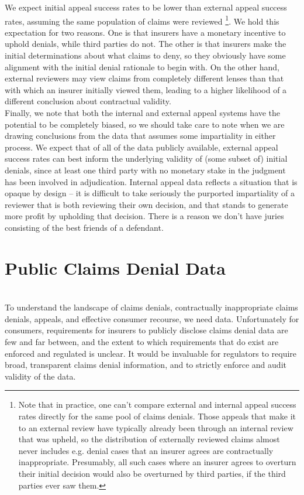 \documentclass[12pt, a4paper]{report}
\begin{document}
We expect initial appeal success rates to be lower than external appeal success rates, assuming the same population of claims were reviewed \footnote{Note that in practice, one can't compare external and internal appeal success rates directly for the same pool of claims denials. Those appeals that make it to an external review have typically already been through an internal review that was upheld, so the distribution of externally reviewed claims almost never includes e.g. denial cases that an insurer agrees are contractually inappropriate. Presumably, all such cases where an insurer agrees to overturn their initial decision would also be overturned by third parties, if the third parties ever saw them.}. We hold this expectation for two reasons. One is that insurers have a monetary incentive to uphold denials, while third parties do not. The other is that insurers make the initial determinations about what claims to deny, so they obviously have some alignment with the initial denial rationale to begin with. On the other hand, external reviewers may view claims from completely different lenses than that with which an insurer initially viewed them, leading to a higher likelihood of a different conclusion about contractual validity.\\

Finally, we note that both the internal and external appeal systems have the potential to be completely biased, so we should take care to note when we are drawing conclusions from the data that assumes some impartiality in either process. We expect that of all of the data publicly available, external appeal success rates can best inform the underlying validity of (some subset of) initial denials, since at least one third party with no monetary stake in the judgment has been involved in adjudication. Internal appeal data reflects a situation that is opaque by design -- it is difficult to take seriously the purported impartiality of a reviewer that is both reviewing their own decision, and that stands to generate more profit by upholding that decision. There is a reason we don't have juries consisting of the best friends of a defendant.

\section{Public Claims Denial Data}
\hfill\\

To understand the landscape of claims denials, contractually inappropriate claims denials, appeals, and effective consumer recourse, we need data. Unfortunately for consumers, requirements for insurers to publicly disclose claims denial data are few and far between, and the extent to which requirements that do exist are enforced and regulated is unclear. It would be invaluable for regulators to require broad, transparent claims denial information, and to strictly enforce and audit validity of the data.\\
\end{document}
